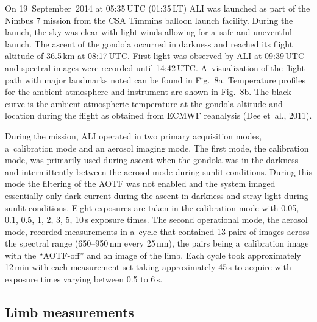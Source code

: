 \documentclass[amtd, online, hvmath]{copernicus}
\begin{document}
On 19~September~2014 at 05:35\,UTC (01:35\,LT) ALI was launched as
part of the Nimbus 7 mission from the CSA Timmins balloon launch
facility.  During the launch, the sky was clear with light winds
allowing for a~safe and uneventful launch. The ascent of the gondola
occurred in darkness and reached its flight altitude of
36.5\,\unit{km} at 08:17\,UTC. First light was observed by ALI at
09:39\,UTC and spectral images were recorded until 14:42\,UTC.
A~visualization of the flight path with major landmarks noted can be
found in Fig.~8a. Temperature profiles for the ambient atmosphere and
instrument are shown in Fig.~8b. The black curve is the ambient
atmospheric temperature at the gondola altitude and location during
the flight as obtained from ECMWF reanalysis (Dee et~al., 2011).

During the mission, ALI operated in two primary acquisition modes,
a~calibration mode and an aerosol imaging mode. The first mode, the
calibration mode, was primarily used during ascent when the gondola
was in the darkness and intermittently between the aerosol mode during
sunlit conditions. During this mode the filtering of the AOTF was not
enabled and the system imaged essentially only dark current during the
ascent in darkness and stray light during sunlit conditions. Eight
exposures are taken in the calibration mode with 0.05, 0.1, 0.5, 1, 2,
3, 5, 10\,s exposure times. The second operational mode, the aerosol
mode, recorded measurements in a~cycle that contained 13 pairs of
images across the spectral range (650--950\,\unit{nm} every
25\,\unit{nm}), the pairs being a~calibration image with the
``AOTF-off'' and an image of the limb. Each cycle took approximately
12\,min with each measurement set taking approximately 45\,s to
acquire with exposure times varying between 0.5 to 6\,s.

\subsection{Limb measurements}
\end{document}
